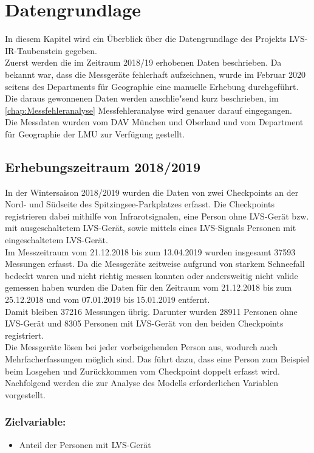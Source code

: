 \documentclass[12pt]{scrreprt}
\begin{document}
\chapter{Datengrundlage}
In diesem Kapitel wird ein Überblick über die Datengrundlage des Projekts LVS-IR-Taubenstein gegeben. \\
Zuerst werden die im Zeitraum 2018/19 erhobenen Daten beschrieben. Da bekannt war, dass die Messgeräte fehlerhaft aufzeichnen, wurde im Februar 2020 seitens des Departments für Geographie eine manuelle Erhebung durchgeführt. Die daraus gewonnenen Daten werden anschlie"send kurz beschrieben, im \autoref{chap:Messfehleranalyse} Messfehleranalyse wird genauer darauf eingegangen. \\
Die Messdaten wurden vom DAV München und Oberland und vom Department für Geographie der LMU zur Verfügung gestellt.

\section{Erhebungszeitraum 2018/2019}
In der Wintersaison 2018/2019 wurden die Daten von zwei Checkpoints an der Nord- und Südseite des Spitzingsee-Parkplatzes erfasst. Die Checkpoints registrieren dabei mithilfe von Infrarotsignalen, eine Person ohne LVS-Gerät bzw. mit ausgeschaltetem LVS-Gerät, sowie mittels eines LVS-Signals Personen mit eingeschaltetem LVS-Gerät. \\
Im Messzeitraum vom 21.12.2018 bis zum 13.04.2019 wurden insgesamt 37593 Messungen erfasst. Da die Messgeräte zeitweise aufgrund von starkem Schneefall bedeckt waren und nicht richtig messen konnten oder andersweitig nicht valide gemessen haben wurden die Daten für den Zeitraum vom 21.12.2018 bis zum 25.12.2018 und vom 07.01.2019 bis 15.01.2019 entfernt. \\
Damit bleiben 37216 Messungen übrig. Darunter wurden 28911 Personen ohne LVS-Gerät und 8305 Personen mit LVS-Gerät von den beiden Checkpoints registriert. \\
Die Messgeräte lösen bei jeder vorbeigehenden Person aus, wodurch auch Mehrfacherfassungen möglich sind. Das führt dazu, dass eine Person zum Beispiel beim Losgehen und Zurückkommen vom Checkpoint doppelt erfasst wird. \\
Nachfolgend werden die zur Analyse des Modells erforderlichen Variablen vorgestellt.
\subsection*{Zielvariable:}
\begin{itemize}
	\item Anteil der Personen mit LVS-Gerät
\end{itemize}
\end{document}
